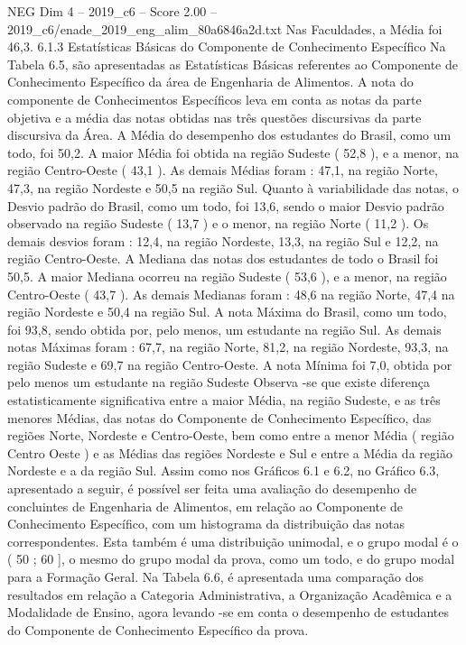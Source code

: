 \begin{textsample}{NEG Dim 4 – 2019\_c6 – Score 2.00 – 2019\_c6/enade\_2019\_eng\_alim\_80a6846a2d.txt}
Nas Faculdades, a Média foi 46,3. 6.1.3 Estatísticas Básicas do Componente de Conhecimento Específico Na Tabela 6.5, são apresentadas as Estatísticas Básicas referentes ao Componente de Conhecimento Específico da área de Engenharia de Alimentos.
A nota do componente de Conhecimentos Específicos leva em conta as notas da parte objetiva e a média das notas obtidas nas três questões discursivas da parte discursiva da Área.
A Média do desempenho dos estudantes do Brasil, como um todo, foi 50,2.
A maior Média foi obtida na região Sudeste ( 52,8 ), e a menor, na região Centro-Oeste ( 43,1 ).
As demais Médias foram : 47,1, na região Norte, 47,3, na região Nordeste e 50,5 na região Sul.
Quanto à variabilidade das notas, o Desvio padrão do Brasil, como um todo, foi 13,6, sendo o maior Desvio padrão observado na região Sudeste ( 13,7 ) e o menor, na região Norte ( 11,2 ).
Os demais desvios foram : 12,4, na região Nordeste, 13,3, na região Sul e 12,2, na região Centro-Oeste.
A Mediana das notas dos estudantes de todo o Brasil foi 50,5.
A maior Mediana ocorreu na região Sudeste ( 53,6 ), e a menor, na região Centro-Oeste ( 43,7 ).
As demais Medianas foram : 48,6 na região Norte, 47,4 na região Nordeste e 50,4 na região Sul.
A nota Máxima do Brasil, como um todo, foi 93,8, sendo obtida por, pelo menos, um estudante na região Sul.
As demais notas Máximas foram : 67,7, na região Norte, 81,2, na região Nordeste, 93,3, na região Sudeste e 69,7 na região Centro-Oeste.
A nota Mínima foi 7,0, obtida por pelo menos um estudante na região Sudeste Observa -se que existe diferença estatisticamente significativa entre a maior Média, na região Sudeste, e as três menores Médias, das notas do Componente de Conhecimento Específico, das regiões Norte, Nordeste e Centro-Oeste, bem como entre a menor Média ( região Centro Oeste ) e as Médias das regiões Nordeste e Sul e entre a Média da região Nordeste e a da região Sul.
Assim como nos Gráficos 6.1 e 6.2, no Gráfico 6.3, apresentado a seguir, é possível ser feita uma avaliação do desempenho de concluintes de Engenharia de Alimentos, em relação ao Componente de Conhecimento Específico, com um histograma da distribuição das notas correspondentes.
Esta também é uma distribuição unimodal, e o grupo modal é o ( 50 ; 60 ], o mesmo do grupo modal da prova, como um todo, e do grupo modal para a Formação Geral.
Na Tabela 6.6, é apresentada uma comparação dos resultados em relação a Categoria Administrativa, a Organização Acadêmica e a Modalidade de Ensino, agora levando -se em conta o desempenho de estudantes do Componente de Conhecimento Específico da prova.

\end{textsample}

